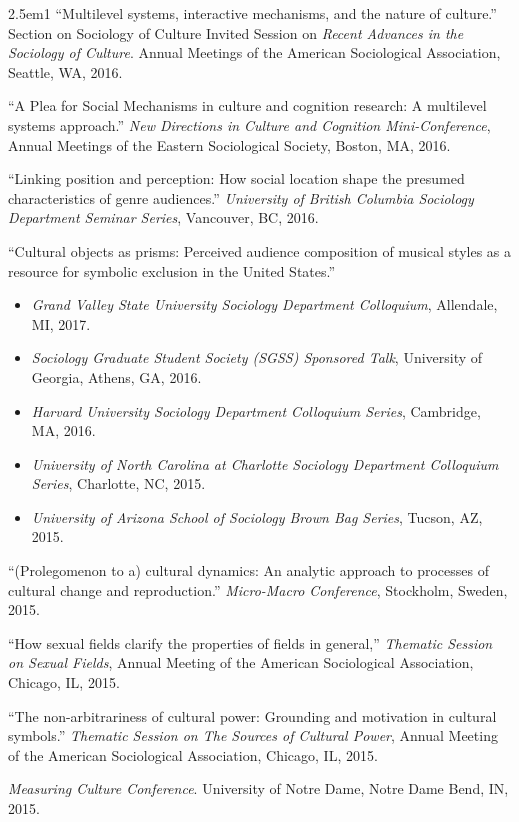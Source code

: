 \documentclass[
]{article}
\providecommand{\tightlist}{%
  \setlength{\itemsep}{0pt}\setlength{\parskip}{0pt}}
\newenvironment{cventry}{\begin{hangparas}{2.5em}{1}}{\end{hangparas}}
\begin{document}
\begin{cventry}
``Multilevel systems, interactive mechanisms, and the nature of
culture.'' Section on Sociology of Culture Invited Session on
\emph{Recent Advances in the Sociology of Culture}. Annual Meetings of
the American Sociological Association, Seattle, WA, 2016.

``A Plea for Social Mechanisms in culture and cognition research: A
multilevel systems approach.'' \emph{New Directions in Culture and
Cognition Mini-Conference}, Annual Meetings of the Eastern Sociological
Society, Boston, MA, 2016.

``Linking position and perception: How social location shape the
presumed characteristics of genre audiences.'' \emph{University of
British Columbia Sociology Department Seminar Series}, Vancouver, BC,
2016.

``Cultural objects as prisms: Perceived audience composition of musical
styles as a resource for symbolic exclusion in the United States.''

\begin{itemize}
\tightlist
\item
  \emph{Grand Valley State University Sociology Department Colloquium},
  Allendale, MI, 2017.
\item
  \emph{Sociology Graduate Student Society (SGSS) Sponsored Talk},
  University of Georgia, Athens, GA, 2016.
\item
  \emph{Harvard University Sociology Department Colloquium Series},
  Cambridge, MA, 2016.
\item
  \emph{University of North Carolina at Charlotte Sociology Department
  Colloquium Series}, Charlotte, NC, 2015.
\item
  \emph{University of Arizona School of Sociology Brown Bag Series},
  Tucson, AZ, 2015.
\end{itemize}

``(Prolegomenon to a) cultural dynamics: An analytic approach to
processes of cultural change and reproduction.'' \emph{Micro-Macro
Conference}, Stockholm, Sweden, 2015.

``How sexual fields clarify the properties of fields in general,''
\emph{Thematic Session on Sexual Fields}, Annual Meeting of the American
Sociological Association, Chicago, IL, 2015.

``The non-arbitrariness of cultural power: Grounding and motivation in
cultural symbols.'' \emph{Thematic Session on The Sources of Cultural
Power}, Annual Meeting of the American Sociological Association,
Chicago, IL, 2015.

\emph{Measuring Culture Conference}. University of Notre Dame, Notre
Dame Bend, IN, 2015.

\end{cventry}
\end{document}
